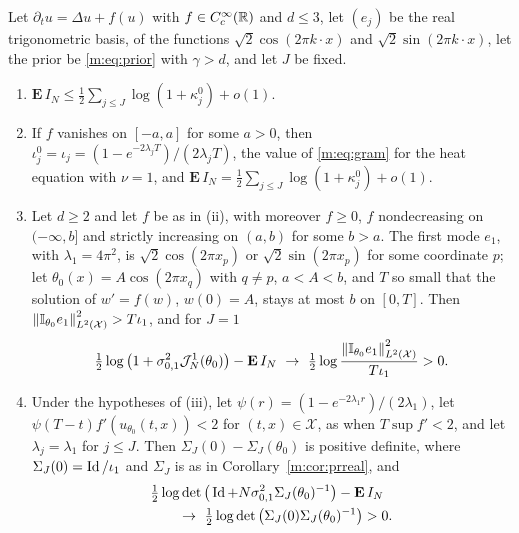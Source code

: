 \begin{proposition}\label{m:prop:prrd}
Let $\partial_tu=\Delta u+f(u)$ with $f\in C_c^\infty(\mathbb{R})$ and $d\le3$, let $(e_j)$ be the real trigonometric basis, of the functions $\sqrt2\cos(2\pi k\cdot x)$ and $\sqrt2\sin(2\pi k\cdot x)$, let the prior be \eqref{m:eq:prior} with $\gamma>d$, and let $J$ be fixed.
\begin{enumerate}[label=(\roman*),nosep]
\item $\mathbf E\,I_N\le\tfrac12\sum_{j\le J}\log(1+\kappa^0_j)+o(1)$.
\item If $f$ vanishes on $[-a,a]$ for some $a>0$, then $\iota^0_j=\iota_j=(1-e^{-2\lambda_jT})/(2\lambda_jT)$, the value of \eqref{m:eq:gram} for the heat equation with $\nu=1$, and $\mathbf E\,I_N=\tfrac12\sum_{j\le J}\log(1+\kappa^0_j)+o(1)$.
\item Let $d\ge2$ and let $f$ be as in (ii), with moreover $f\ge0$, $f$ nondecreasing on $(-\infty,b]$ and strictly increasing on $(a,b)$ for some $b>a$. The first mode $e_1$, with $\lambda_1=4\pi^2$, is $\sqrt2\cos(2\pi x_p)$ or $\sqrt2\sin(2\pi x_p)$ for some coordinate $p$; let $\theta_0(x)=A\cos(2\pi x_q)$ with $q\ne p$, $a<A<b$, and $T$ so small that the solution of $w'=f(w)$, $w(0)=A$, stays at most $b$ on $[0,T]$. Then $\left\|\mathbb{I}_{\theta_0}e_1\right\|^2_{L^2(\mathcal X)}>T\iota_1$, and for $J=1$
\[
\tfrac12\log\big(1+\sigma^2_{0,1}\mathcal J^1_N(\theta_0)\big)-\mathbf E\,I_N\ \to\ \tfrac12\log\frac{\norm{\I_{\theta_0}e_1}^2_{L^2(\mathcal X)}}{T\iota_1}>0 .
\]
\item Under the hypotheses of (iii), let $\psi(r)=(1-e^{-2\lambda_1r})/(2\lambda_1)$, let $\psi(T-t)f'(u_{\theta_0}(t,x))<2$ for $(t,x)\in\mathcal X$, as when $T\sup f'<2$, and let $\lambda_j=\lambda_1$ for $j\le J$. Then $\Sigma_J(0)-\Sigma_J(\theta_0)$ is positive definite, where $\Sigma_J(0)=\operatorname{Id}/\iota_1$ and $\Sigma_J$ is as in Corollary~\ref{m:cor:prreal}, and
\[
\begin{aligned}
&\tfrac12\log\det\big(\Id+N\sigma^2_{0,1}\Sigma_J(\theta_0)^{-1}\big)-\mathbf E\,I_N\\
&\qquad\to\ \tfrac12\log\det\big(\Sigma_J(0)\Sigma_J(\theta_0)^{-1}\big)>0 .
\end{aligned}
\]
\end{enumerate}
\end{proposition}

